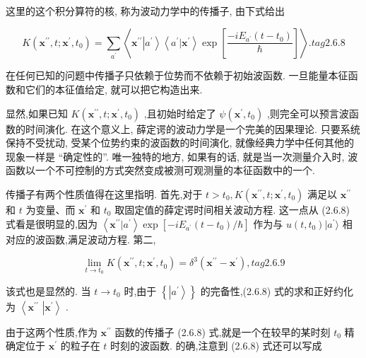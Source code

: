 \documentclass[lang=cn,newtx,10pt,scheme=chinese,thmcnt=section]{elegantbook}
\begin{document}
这里的这个积分算符的核, 称为波动力学中的传播子, 由下式给出

$$
K\left( {{\mathbf{x}}^{\prime \prime }, t;{\mathbf{x}}^{\prime },{t}_{0}}\right) = \mathop{\sum }\limits_{{a}^{\prime }}\left\langle {{\mathbf{x}}^{\prime \prime }\left| {a}^{\prime }\right\rangle \left\langle {{a}^{\prime } | {\mathbf{x}}^{\prime }}\right\rangle \exp \left\lbrack \frac{-i{E}_{{a}^{\prime }}\left( {t - {t}_{0}}\right) }{\hbar }\right\rbrack }\right\rangle . tag{2.6.8}
$$

在任何已知的问题中传播子只依赖于位势而不依赖于初始波函数. 一旦能量本征函数和它们的本征值给定, 就可以把它构造出来.

显然,如果已知 $K\left( {{\mathbf{x}}^{\prime \prime }, t;{\mathbf{x}}^{\prime },{t}_{0}}\right)$ ,且初始时给定了 $\psi \left( {{\mathbf{x}}^{\prime },{t}_{0}}\right)$ ,则完全可以预言波函数的时间演化. 在这个意义上, 薛定谔的波动力学是一个完美的因果理论. 只要系统保持不受扰动, 受某个位势约束的波函数的时间演化, 就像经典力学中任何其他的现象一样是 “确定性的”. 唯一独特的地方, 如果有的话, 就是当一次测量介入时, 波函数以一个不可控制的方式突然变成被测可观测量的本征函数中的一个.

传播子有两个性质值得在这里指明. 首先,对于 $t > {t}_{0}, K\left( {{\mathbf{x}}^{\prime \prime }, t;{\mathbf{x}}^{\prime },{t}_{0}}\right)$ 满足以 ${\mathbf{x}}^{\prime \prime }$ 和 $t$ 为变量、而 ${\mathbf{x}}^{\prime }$ 和 ${t}_{0}$ 取固定值的薛定谔时间相关波动方程. 这一点从 (2.6.8) 式看是很明显的,因为 $\left\langle {{\mathbf{x}}^{\prime \prime } | {a}^{\prime }}\right\rangle \exp \left\lbrack {-i{E}_{{a}^{\prime }}\left( {t - {t}_{0}}\right) /\hbar }\right\rbrack$ 作为与 $u\left( {t,{t}_{0}}\right) | {a}^{\prime }\rangle$ 相对应的波函数,满足波动方程. 第二,

$$
\mathop{\lim }\limits_{{t \rightarrow {t}_{0}}}K\left( {{\mathbf{x}}^{\prime \prime }, t;{\mathbf{x}}^{\prime },{t}_{0}}\right) = {\delta }^{3}\left( {{\mathbf{x}}^{\prime \prime } - {\mathbf{x}}^{\prime }}\right) , tag{2.6.9}
$$

该式也是显然的. 当 $t \rightarrow {t}_{0}$ 时,由于 $\left\{ \left| {a}^{\prime }\right\rangle \right\}$ 的完备性,(2.6.8) 式的求和正好约化为 $\left\langle {\mathbf{x}}^{\prime \prime }\right.$ $\left| {\mathbf{x}}^{\prime }\right\rangle$ .

由于这两个性质,作为 ${\mathbf{x}}^{\prime \prime }$ 函数的传播子 (2.6.8) 式,就是一个在较早的某时刻 ${t}_{0}$ 精确定位于 ${\mathbf{x}}^{\prime }$ 的粒子在 $t$ 时刻的波函数. 的确,注意到 (2.6.8) 式还可以写成
\end{document}
